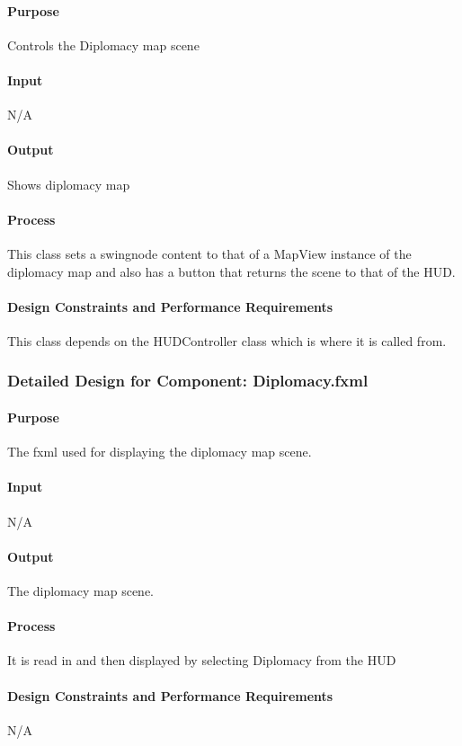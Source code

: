 \documentclass[12pt,a4paper,titlepage]{article}
\begin{document}
\paragraph{Purpose} Controls the Diplomacy map scene
\paragraph{Input} N/A
\paragraph{Output} Shows diplomacy map
\paragraph{Process} This class sets a swingnode content to that of a MapView instance of the 
		diplomacy map and also has a button that returns the scene to that of the HUD.
\paragraph{Design Constraints and Performance Requirements} This class depends on the 
		HUDController class which is where it is called from. 

\subsubsection{Detailed Design for Component: Diplomacy.fxml }
\paragraph{Purpose} The fxml used for displaying the diplomacy map scene.
\paragraph{Input} N/A
\paragraph{Output} The diplomacy map scene.
\paragraph{Process} It is read in and then displayed by selecting Diplomacy from the HUD
\paragraph{Design Constraints and Performance Requirements} N/A
\end{document}
